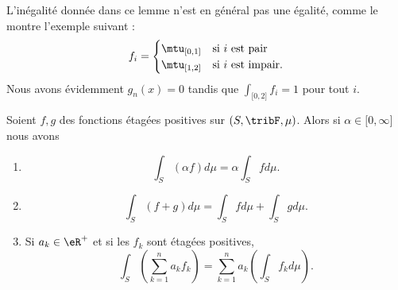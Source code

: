 L'inégalité donnée dans ce lemme n'est en général pas une égalité, comme le montre l'exemple suivant :
\begin{equation}
    f_i=\begin{cases}
        \mtu_{\mathopen[ 0 , 1 \mathclose]}    &   \text{si } i\text{ est pair}\\
        \mtu_{\mathopen[ 1 , 2 \mathclose]}    &    \text{si } i\text{ est impair}.
    \end{cases}
\end{equation}
Nous avons évidemment \( g_n(x)=0\) tandis que \( \int_{\mathopen[ 0 , 2 \mathclose]}f_i=1\) pour tout \( i\).

\begin{theorem}        \label{ThoooCZCXooVvNcFD}
    Soient \( f,g\) des fonctions étagées positives sur \( (S,\tribF,\mu)\). Alors si \( \alpha\in\mathopen[ 0 , \infty \mathclose]\) nous avons
    \begin{enumerate}
        \item
            \begin{equation}
                \int_S(\alpha f)d\mu=\alpha\int_Sfd\mu.
            \end{equation}
        \item       \label{ITEMooBLEVooDznQTY}
            \begin{equation}
                \int_S(f+g)d\mu=\int_Sfd\mu+\int_Sgd\mu.
            \end{equation}
        \item\label{ITEMooOJRAooQkoQyD}
    Si \( a_k\in \eR^+\) et si les \( f_k\) sont étagées positives,
    \begin{equation}
        \int_S\left( \sum_{k=1}^na_kf_k \right)=\sum_{k=1}^na_k\left( \int_S f_kd\mu \right).
    \end{equation}
    \end{enumerate}
\end{theorem}

